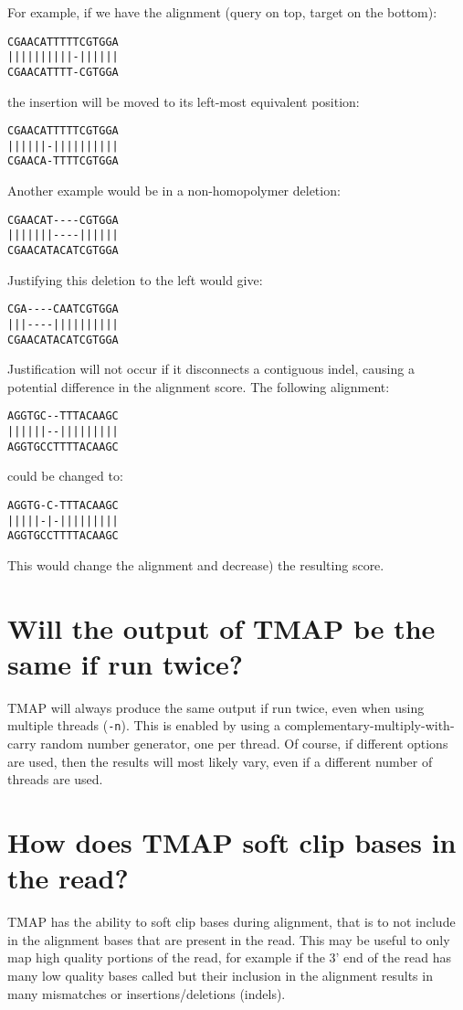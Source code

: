 \documentclass[a4paper,12pt]{book}
\newcommand{\TT}[1]{{\tt #1}} %
\begin{document}
For example, if we have the alignment (query on top, target on the bottom):
\begin{verbatim}
CGAACATTTTTCGTGGA
||||||||||-||||||
CGAACATTTT-CGTGGA
\end{verbatim}
the insertion will be moved to its left-most equivalent position:
\begin{verbatim}
CGAACATTTTTCGTGGA
||||||-||||||||||
CGAACA-TTTTCGTGGA
\end{verbatim}
Another example would be in a non-homopolymer deletion: 
\begin{verbatim}
CGAACAT----CGTGGA
|||||||----||||||
CGAACATACATCGTGGA
\end{verbatim}
Justifying this deletion to the left would give:
\begin{verbatim}
CGA----CAATCGTGGA
|||----||||||||||
CGAACATACATCGTGGA
\end{verbatim}
Justification will not occur if it disconnects a contiguous indel, causing a potential difference in the alignment score.
The following alignment:
\begin{verbatim}
AGGTGC--TTTACAAGC
||||||--|||||||||
AGGTGCCTTTTACAAGC
\end{verbatim}
could be changed to: 
\begin{verbatim}
AGGTG-C-TTTACAAGC
|||||-|-|||||||||
AGGTGCCTTTTACAAGC
\end{verbatim}
This would change the alignment and decrease) the resulting score.

\section{Will the output of TMAP be the same if run twice?}
TMAP will always produce the same output if run twice, even when using multiple threads (\TT{-n}).
This is enabled by using a complementary-multiply-with-carry random number generator, one per thread.
Of course, if different options are used, then the results will most likely vary, even if a different number of threads are used.

\section{How does TMAP soft clip bases in the read?} 
\label{sec:howtosoftclip}
TMAP has the ability to soft clip bases during alignment, that is to not include in the alignment bases that are present in the read.  
This may be useful to only map high quality portions of the read, for example if the 3' end of the read has many low quality bases called but their inclusion in the alignment results in many mismatches or insertions/deletions (indels).
\end{document}
